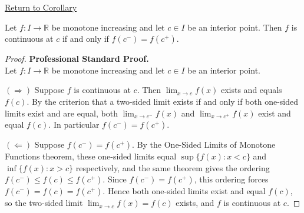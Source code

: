 \newpage
{}
\label{prf:monotone-continuity-criterion}

\begin{remark*}[Return]
\hyperref[cor:monotone-continuity-criterion]{Return to Corollary}
\end{remark*}

\begin{theorem*}
Let $f : I \to \mathbb{R}$ be monotone increasing and let $c \in I$ be an interior point. Then $f$ is continuous at $c$ if and only if $f(c^{-}) = f(c^{+})$.
\end{theorem*}

\begin{proof}
\textbf{Professional Standard Proof.}~\\
Let $f : I \to \mathbb{R}$ be monotone increasing and let $c \in I$ be an interior point.

$(\Rightarrow)$ Suppose $f$ is continuous at $c$. Then $\lim_{x \to c} f(x)$ exists and equals $f(c)$. By the criterion that a two-sided limit exists if and only if both one-sided limits exist and are equal, both $\lim_{x \to c^{-}} f(x)$ and $\lim_{x \to c^{+}} f(x)$ exist and equal $f(c)$. In particular $f(c^{-}) = f(c^{+})$.

$(\Leftarrow)$ Suppose $f(c^{-}) = f(c^{+})$. By the One-Sided Limits of Monotone Functions theorem, these one-sided limits equal $\sup\{f(x) : x < c\}$ and $\inf\{f(x) : x > c\}$ respectively, and the same theorem gives the ordering $f(c^{-}) \leq f(c) \leq f(c^{+})$. Since $f(c^{-}) = f(c^{+})$, this ordering forces $f(c^{-}) = f(c) = f(c^{+})$. Hence both one-sided limits exist and equal $f(c)$, so the two-sided limit $\lim_{x \to c} f(x) = f(c)$ exists, and $f$ is continuous at $c$.
\end{proof}

